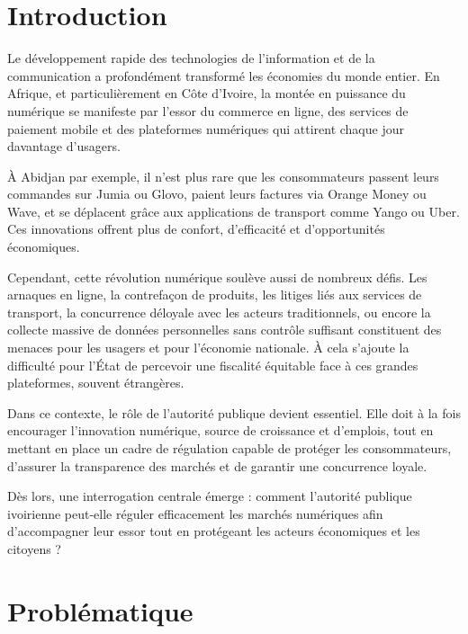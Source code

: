 
\section*{Introduction}

Le développement rapide des technologies de l’information et de la communication a profondément transformé les économies du monde entier. En Afrique, et particulièrement en Côte d’Ivoire, la montée en puissance du numérique se manifeste par l’essor du commerce en ligne, des services de paiement mobile et des plateformes numériques qui attirent chaque jour davantage d’usagers.

À Abidjan par exemple, il n’est plus rare que les consommateurs passent leurs commandes sur Jumia ou Glovo, paient leurs factures via Orange Money ou Wave, et se déplacent grâce aux applications de transport comme Yango ou Uber. Ces innovations offrent plus de confort, d’efficacité et d’opportunités économiques.

Cependant, cette révolution numérique soulève aussi de nombreux défis. Les arnaques en ligne, la contrefaçon de produits, les litiges liés aux services de transport, la concurrence déloyale avec les acteurs traditionnels, ou encore la collecte massive de données personnelles sans contrôle suffisant constituent des menaces pour les usagers et pour l’économie nationale. À cela s’ajoute la difficulté pour l’État de percevoir une fiscalité équitable face à ces grandes plateformes, souvent étrangères.

Dans ce contexte, le rôle de l’autorité publique devient essentiel. Elle doit à la fois encourager l’innovation numérique, source de croissance et d’emplois, tout en mettant en place un cadre de régulation capable de protéger les consommateurs, d’assurer la transparence des marchés et de garantir une concurrence loyale.

Dès lors, une interrogation centrale émerge :
comment l’autorité publique ivoirienne peut-elle réguler efficacement les marchés numériques afin d’accompagner leur essor tout en protégeant les acteurs économiques et les citoyens ?

\section*{Problématique}

